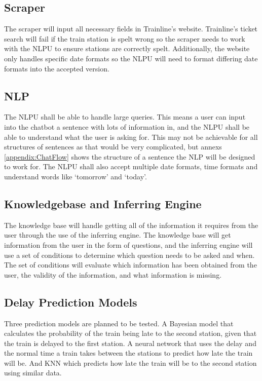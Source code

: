 \documentclass[11pt]{article}
\begin{document}
	
	\subsection{Scraper}
	The scraper will input all necessary fields in Trainline’s website. Trainline’s ticket search will fail if the train station is spelt wrong so the scraper needs to work with the NLPU to ensure stations are correctly spelt. Additionally, the website only handles specific date formats so the NLPU will need to format differing date formats into the accepted version.
	
	\subsection{NLP}
	The NLPU shall be able to handle large queries. This means a user can input into the chatbot a sentence with lots of information in, and the NLPU shall be able to understand what the user is asking for. This may not be achievable for all structures of sentences as that would be very complicated, but annexs \ref{appendix:ChatFlow} shows the structure of a sentence the NLP will be designed to work for. The NLPU shall also accept multiple date formats, time formats and understand words like ‘tomorrow’ and ‘today’.
	
	
	\subsection{Knowledgebase and Inferring Engine}
	The knowledge base will handle getting all of the information it requires from the user through the use of the inferring engine. The knowledge base will get information from the user in the form of questions, and the inferring engine will use a set of conditions to determine which question needs to be asked and when. The set of conditions will evaluate which information has been obtained from the user, the validity of the information, and what information is missing.
	
	\subsection{Delay Prediction Models}
	
	Three prediction models are planned to be tested. A Bayesian model that calculates the probability of the train being late to the second station, given that the train is delayed to the first station. A neural network that uses the delay and the normal time a train takes between the stations to predict how late the train will be. And KNN which predicts how late the train will be to the second station using similar data.
	
\end{document}

